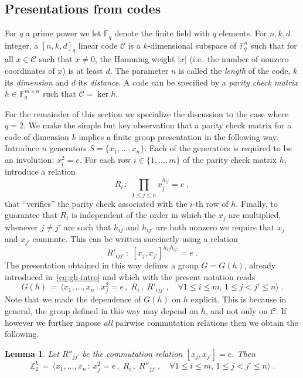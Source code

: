 \documentclass[11pt]{article}
\newtheorem{lemma}[theorem]{Lemma}
\theoremstyle{definition}
\newcommand{\code}{\mathscr{C}}
\newcommand{\F}{\ensuremath{\mathbb{F}}}
\newcommand{\Z}{\ensuremath{\mathbb{Z}}}
\begin{document}
\subsection{Presentations from codes}
\label{sec:pres-code}

For $q$ a prime power we let $\F_q$ denote the finite field with $q$ elements. 
For $n,k,d$ integer, a $[n,k,d]_q$ linear code $\code$ is a $k$-dimensional subspace of $\F_q^n$ such that for all $x\in \code$ such that $x\neq 0$, the Hamming weight $|x|$ (i.e.\ the number of nonzero coordinates of $x$) is at least $d$. The parameter $n$ is called the \emph{length} of the code, $k$ its \emph{dimension} and $d$ its \emph{distance}. A code can be specified by a \emph{parity check matrix} $h\in \F_q^{m\times n}$ such that $\code = \ker h$. 

For the remainder of this section we specialize the discussion to the case where $q=2$. 
We make the simple but key observation that a parity check matrix for a code of dimension $k$ implies a finite group presentation in the following way. Introduce $n$ generators $S=\{x_1,\ldots,x_n\}$. Each of the generators is required to be an involution: $x_i^2=e$. For each row $i\in \{1,\ldots,m\}$ of the parity check matrix $h$, introduce a relation 
\[ R_i\,:\; \prod_{1\leq j \leq n} x_j^{h_{ij}}=e\;, \]
that ``verifies'' the parity check associated with the $i$-th row of $h$. Finally, to guarantee that $R_i$ is independent of the order in which the $x_j$ are multiplied, whenever $j\neq j'$ are such that $h_{ij}$ and $h_{ij'}$ are both nonzero we require that $x_j$ and $x_{j'}$ commute. This can be written succinctly using a relation 
\[ R'_{ijj'}\,:\; [x_j,x_{j'}]^{h_{ij} h_{ij'}}=e\;.\]
The presentation obtained in this way defines a group $G=G(h)$, already introduced in~\eqref{eq:gh-intro} and which with the present notation reads
\begin{equation}\label{eq:def-gh-pres}
 G(h) \,=\, \big\langle x_1,\ldots,x_n \,:\, x_j^2=e\,,\; R_i\,,\; R'_{ijj'}\,,\quad \forall 1\leq i\leq m,\, 1\leq j< j' \leq n\big\rangle\;.
\end{equation}
Note that we made the dependence of $G(h)$ on $h$ explicit. This is because in general, the group defined in this way may depend on $h$, and not only on $\code$. If however we further impose \emph{all} pairwise commutation relations then we obtain the following. 

\begin{lemma}\label{lem:com-code}
Let $R''_{jj'}$ be the commutation relation $[x_j,x_{j'}]=e$. Then
\[ \Z_2^k \,=\, \big\langle x_1,\ldots,x_n \,:\, x_j^2=e\,,\; R_i\,,\; R''_{jj'}\,,\quad \forall 1\leq i\leq m,\, 1\leq j< j' \leq n\big\rangle\;.\]
\end{lemma}
\end{document}
